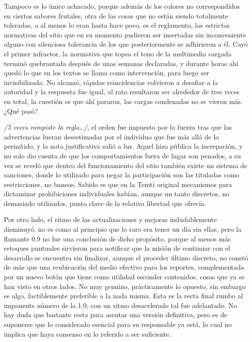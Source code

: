 \documentclass[
]{book}
\begin{document}
Tampoco es lo único achacado, porque además de los colores no correspondidos en ciertos sabores frutales, otra de las cosas que no están siendo totalmente toleradas, o al menos lo eran hasta hace poco, es el reglamento, las estrictas normativas del sitio que en su momento pudieron ser insertadas sin inconveniente alguno con silenciosa tolerancia de los que posteriormente se adhirieron a él. Cayó el primer infractor, la normativa que topea el tono de la multimedia cargada terminó quebrantada después de unas semanas declaradas, y durante horas ahí quedó lo que en los textos se llama como intervención, para luego ser invisibilizada. No alcanzó, rápidas reincidencias volvieron a desafiar a la autoridad y la respuesta fue igual, al rato resultaron ser alrededor de tres veces en total, la cuestión es que ahí pararon, las cargas condenadas no se vieron más. ¿Qué pasó?

\emph{/5 veces rompiste la regla\ldots/}, el orden fue impuesto por la fuerza tras que las advertencias fueran desestimadas por el individuo que fue más allá de lo permitido, y la nota justificativa salió a luz. Aquel hizo pública la increpación, y no solo dio cuenta de que los comportamientos fuera de lugar son penados, a su vez se reveló que dentro del funcionamiento del sitio también existe un sistema de sanciones, donde lo utilizado para negar la participación son las tituladas como restricciones, no baneos. Sabido es que en la Temti original mecanismos para dictaminar prohibiciones individuales habían, aunque un tanto discretos, no demasiado utilizados, punto clave de la relativa libertad que ofrecía.

Por otro lado, el ritmo de las actualizaciones y mejoras indudablemente disminuyó, no es como al principio que lo raro era tener un día sin ellas, pero la flamante 0.9 no fue una conclusión de dicho propósito, porque al menos más retoques puntuales sirvieron para notificar que la misión de continuar con el desarrollo se encuentra sin finalizar, aunque el proceder último discreto, no constó de más que una reubicación del medio efectivo para los reportes, complementada por un nuevo botón que tiene como utilidad esconder contenidos, cosas que ya se han visto en otros lados. No muy genuino, prácticamente lo opuesto, sin embargo es algo, factiblemente preferible a la nada misma. Esta es la recta final rumbo al imponente número de la 1.0, con un ritmo desacelerado tal fue adelantado. No hay duda que bastante resta para asentar una versión definitiva, pero es de suponerse que lo considerado esencial para su responsable ya está, lo cual no implica que haya consenso en lo referido a ser suficiente.
\end{document}

